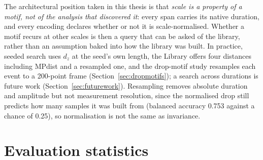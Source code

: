 The architectural position taken in this thesis is that \emph{scale is a property of a motif, not of the analysis that discovered it}: every span carries its native duration, and every encoding declares whether or not it is scale-normalised. Whether a motif recurs at other scales is then a query that can be asked of the library, rather than an assumption baked into how the library was built. In practice, seeded search uses $d_z$ at the seed's own length, the Library offers four distances including MPdist \cite{gharghabi2018mpdist} and a resampled one, and the drop-motif study resamples each event to a 200-point frame (Section~\ref{sec:dropmotifs}); a search across durations is future work (Section~\ref{sec:futurework}). Resampling removes absolute duration and amplitude but not measurement resolution, since the normalised drop still predicts how many samples it was built from (balanced accuracy 0.753 against a chance of 0.25), so normalisation is not the same as invariance.

\section{Evaluation statistics}
\label{sec:stats}


